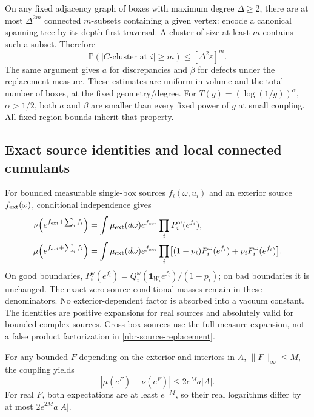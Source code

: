 On any fixed adjacency graph of boxes with maximum degree
\(\Delta\ge2\), there are at most \(\Delta^{2m}\) connected
\(m\)-subsets containing a given vertex: encode a canonical spanning
tree by its depth-first traversal. A cluster of size at least \(m\)
contains such a subset. Therefore
\begin{equation}
 \mathbb P(|C\text{-cluster at }i|\ge m)
       \le[\Delta^2\varepsilon]^m.
 \label{nbr-cluster}
\end{equation}
The same argument gives \(a\) for discrepancies and \(\beta\) for
defects under the replacement measure. These estimates are uniform
in volume and the total number of boxes, at the fixed geometry/degree.
For \(T(g)=(\log(1/g))^\alpha\), \(\alpha>1/2\), both \(a\)
and \(\beta\) are smaller than every fixed power of \(g\) at small
coupling. All fixed-region bounds inherit that property.

\subsection{Exact source identities and local connected cumulants}
\label{nbr-source-section}

For bounded measurable single-box sources \(f_i(\omega,u_i)\) and an
exterior source \(f_{\rm ext}(\omega)\), conditional independence gives
\begin{align}
 \nu\!\left(e^{f_{\rm ext}+\sum_i f_i}\right)
 &=\int\mu_{\rm ext}(d\omega)e^{f_{\rm ext}}
                             \prod_iP_i^\omega(e^{f_i}),
 \label{nbr-source-replacement}\\
 \mu\!\left(e^{f_{\rm ext}+\sum_i f_i}\right)
 &=\int\mu_{\rm ext}(d\omega)e^{f_{\rm ext}}
       \prod_i\bigl[(1-p_i)P_i^\omega(e^{f_i})
                           +p_iF_i^\omega(e^{f_i})\bigr].
 \label{nbr-source-original}
\end{align}
On good boundaries,
\(P_i^\omega(e^{f_i})=Q_i^\omega(\mathbf1_{W_i}e^{f_i})/(1-p_i)\);
on bad boundaries it is unchanged. The exact zero-source conditional
masses remain in these denominators. No exterior-dependent factor is
absorbed into a vacuum constant. The identities are positive expansions
for real sources and absolutely valid for bounded complex sources.
Cross-box sources use the full measure expansion, not a false product
factorization in \eqref{nbr-source-replacement}.

For any bounded \(F\) depending on the exterior and interiors in \(A\),
\(\|F\|_\infty\le M\), the coupling yields
\begin{equation}
 |\mu(e^F)-\nu(e^F)|\le2e^M a|A|.
 \label{nbr-source-difference}
\end{equation}
For real \(F\), both expectations are at least \(e^{-M}\), so their
real logarithms differ by at most \(2e^{2M}a|A|\).

